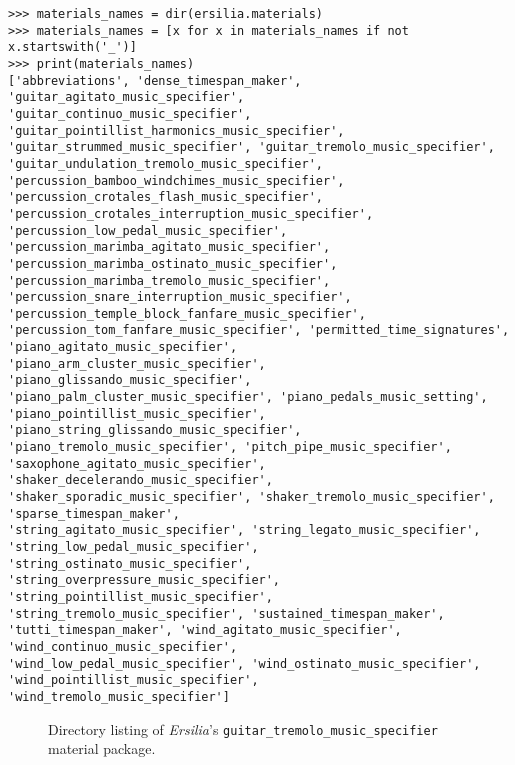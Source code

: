 \begin{abjadbookoutput}
\begin{singlespacing}
\vspace{-0.5\baselineskip}
\begin{verbatim}
>>> materials_names = dir(ersilia.materials)
>>> materials_names = [x for x in materials_names if not x.startswith('_')]
>>> print(materials_names)
['abbreviations', 'dense_timespan_maker', 'guitar_agitato_music_specifier',
'guitar_continuo_music_specifier', 'guitar_pointillist_harmonics_music_specifier',
'guitar_strummed_music_specifier', 'guitar_tremolo_music_specifier',
'guitar_undulation_tremolo_music_specifier', 'percussion_bamboo_windchimes_music_specifier',
'percussion_crotales_flash_music_specifier', 'percussion_crotales_interruption_music_specifier',
'percussion_low_pedal_music_specifier', 'percussion_marimba_agitato_music_specifier',
'percussion_marimba_ostinato_music_specifier', 'percussion_marimba_tremolo_music_specifier',
'percussion_snare_interruption_music_specifier', 'percussion_temple_block_fanfare_music_specifier',
'percussion_tom_fanfare_music_specifier', 'permitted_time_signatures', 'piano_agitato_music_specifier',
'piano_arm_cluster_music_specifier', 'piano_glissando_music_specifier',
'piano_palm_cluster_music_specifier', 'piano_pedals_music_setting', 'piano_pointillist_music_specifier',
'piano_string_glissando_music_specifier', 'piano_tremolo_music_specifier', 'pitch_pipe_music_specifier',
'saxophone_agitato_music_specifier', 'shaker_decelerando_music_specifier',
'shaker_sporadic_music_specifier', 'shaker_tremolo_music_specifier', 'sparse_timespan_maker',
'string_agitato_music_specifier', 'string_legato_music_specifier', 'string_low_pedal_music_specifier',
'string_ostinato_music_specifier', 'string_overpressure_music_specifier',
'string_pointillist_music_specifier', 'string_tremolo_music_specifier', 'sustained_timespan_maker',
'tutti_timespan_maker', 'wind_agitato_music_specifier', 'wind_continuo_music_specifier',
'wind_low_pedal_music_specifier', 'wind_ostinato_music_specifier', 'wind_pointillist_music_specifier',
'wind_tremolo_music_specifier']
\end{verbatim}
\end{singlespacing}
\end{abjadbookoutput}

\begin{figure}[h!]
\begin{singlespacing}
\vspace{-0.5\baselineskip}
\end{singlespacing}
\caption{Directory listing of \emph{Ersilia}'s
\texttt{guitar\_tremolo\_music\_specifier} material package.}
\end{figure}

